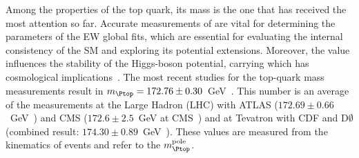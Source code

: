 Among the properties of the top quark, its mass is the one that has received the most attention so far.
Accurate measurements of \mtop are vital for determining the parameters of the EW global fits, which are essential for evaluating the internal consistency of the SM and exploring its potential extensions\cite{ALEPH:2010aa, Baak:2014ora}. Moreover, the \mtop value influences the stability of the Higgs-boson potential, carrying which has cosmological implications~\cite{Degrassi:2012ry, Bezrukov:2007ep, DeSimone:2008ei}.
The most recent studies for the top-quark mass measurements result in $\mtop = 172.76 \pm 0.30$~GeV~\cite{Workman:2022ynf}. %
This number is an average of the measurements at the Large Hadron (LHC) 
with ATLAS ($172.69 \pm 0.66$~GeV~\cite{ATLAS:2018fwq})
and CMS ($172.6 \pm 2.5$~GeV at CMS~\cite{CMS:2019fak}) 
and at Tevatron with CDF and D$\emptyset$ (combined result: $174.30 \pm 0.89$~GeV~\cite{CDF:2016vzt}).
These values are measured from the kinematics of  \ttbar events and refer to the $\mtop^{\text{pole}}$.%
 






